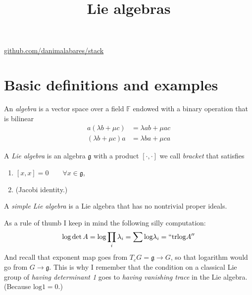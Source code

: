 



\title{Lie algebras}
\maketitle

\label{section-phantom}
\hfill
\href{http://github.com/danimalabares/stack}{github.com/danimalabares/stack}

\tableofcontents

\section{Basic definitions and examples}
\label{section-basic-definitions-and-examples}

\begin{definition}
\label{definition-algebra}
An {\it algebra} is a vector space over a field $\mathbb{F}$ endowed with a
binary operation that is bilinear
\begin{align*}
a(\lambda b+\mu c)&=\lambda ab+\mu ac\\
(\lambda b + \mu c) a &= \lambda b a + \mu c a
\end{align*}
\end{definition}

\begin{definition}
\label{definition-Lie-algebra}
A {\it Lie algebra} is an algebra $\mathfrak{g}$ 
with a product $[\cdot,\cdot]$ we call 
{\it bracket} that satisfies
\begin{enumerate}
\item $[x,x]=0\qquad \forall x\in \mathfrak{g}$,
\item (Jacobi identity.)
\end{enumerate}
\end{definition}

\begin{definition}
\label{definition-simple-Lie-algebra}
A {\it simple Lie algebra} is a Lie algebra that has no nontrivial proper
ideals.
\end{definition}

As a rule of thumb I keep in mind the following silly computation:
$$
\text{log}\det A=\text{log} \prod_{i}\lambda_i=\sum \text{log}\lambda_i
=``\text{tr}\text{log}A''
$$
And recall that exponent map goes from $T_eG= \mathfrak{g} \to G$, so that
logarithm would go from $G\to \mathfrak{g}$. This is why I remember that the
condition on a classical Lie group of 
{\it having determinant 1} goes to {\it having vanishing trace} in the 
Lie algebra. (Because $\text{log}1=0$.)

